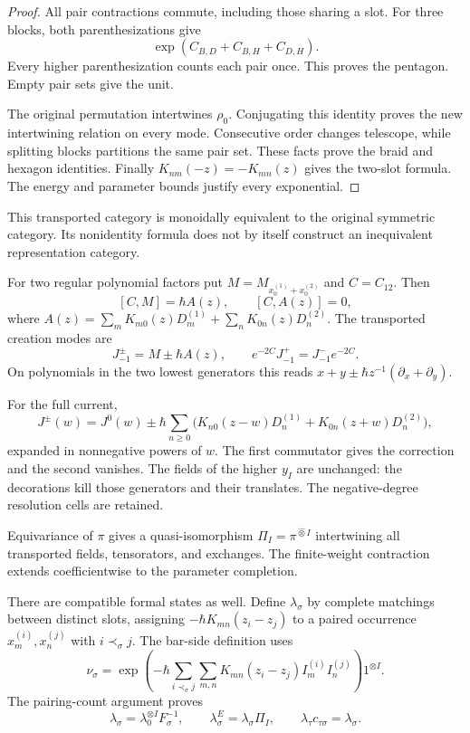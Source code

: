 \begin{proof}
All pair contractions commute, including those sharing
a slot. For three blocks, both parenthesizations give
\[
 \exp(C_{B,D}+C_{B,H}+C_{D,H}).
\]
Every higher parenthesization counts each pair once.
This proves the pentagon. Empty pair sets give the unit.

The original permutation intertwines $\rho_0$.
Conjugating this identity proves the new intertwining
relation on every mode. Consecutive order changes
telescope, while splitting blocks partitions the same
pair set. These facts prove the braid and hexagon identities.
Finally $K_{nm}(-z)=-K_{mn}(z)$ gives the two-slot formula.
The energy and parameter bounds justify every exponential.
\end{proof}

This transported category is monoidally equivalent to the
original symmetric category. Its nonidentity formula
does not by itself construct an inequivalent representation
category.

For two regular polynomial factors put
$M=M_{x_0^{(1)}+x_0^{(2)}}$ and $C=C_{12}$.
Then
\[
 [C,M]=\hbar A(z),\qquad [C,A(z)]=0,
\]
where
$A(z)=\sum_mK_{m0}(z)D_m^{(1)}
+\sum_nK_{0n}(z)D_n^{(2)}$.
The transported creation modes are
\[
 J_{-1}^{\pm}=M\pm\hbar A(z),\qquad
 e^{-2C}J_{-1}^+=J_{-1}^-e^{-2C}.
\]
On polynomials in the two lowest generators this reads
$x+y\pm\hbar z^{-1}(\partial_x+\partial_y)$.

For the full current,
\[
 J^\pm(w)=J^0(w)\pm\hbar\sum_{n\geq0}
 \bigl(K_{n0}(z-w)D_n^{(1)}
       +K_{0n}(z+w)D_n^{(2)}\bigr),
\]
expanded in nonnegative powers of $w$.
The first commutator gives the correction and the second
vanishes. The fields of the higher $y_I$ are unchanged:
the decorations kill those generators and their translates.
The negative-degree resolution cells are retained.

Equivariance of $\pi$ gives a quasi-isomorphism
$\Pi_I=\pi^{\widehat\otimes I}$ intertwining all transported
fields, tensorators, and exchanges.
The finite-weight contraction extends coefficientwise
to the parameter completion.

There are compatible formal states as well.
Define $\lambda_\sigma$ by complete matchings between
distinct slots, assigning
$-\hbar K_{mn}(z_i-z_j)$ to a paired occurrence
$x_m^{(i)},x_n^{(j)}$ with $i\prec_\sigma j$.
The bar-side definition uses
\[
 \nu_\sigma=
 \exp\left(-\hbar\sum_{i\prec_\sigma j}\sum_{m,n}
 K_{mn}(z_i-z_j)I_m^{(i)}I_n^{(j)}\right)1^{\otimes I}.
\]
The pairing-count argument proves
\[
 \lambda_\sigma=\lambda_0^{\otimes I}F_\sigma^{-1},
 \qquad
 \lambda_\sigma^E=\lambda_\sigma\Pi_I,\qquad
 \lambda_\tau c_{\tau\sigma}=\lambda_\sigma.
\]


